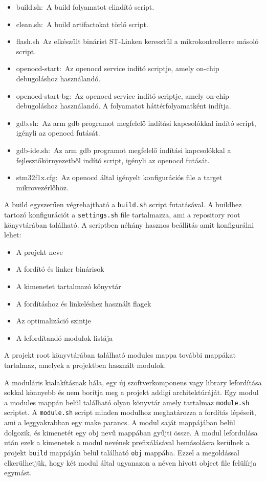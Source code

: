 \begin{itemize}
\item{build.sh:~A build folyamatot elindító script.}
\item{clean.sh:~A build artifactokat törlő script.}
\item{flash.sh~Az elkészült binárist ST-Linken keresztül a mikrokontrollerre
  másoló script.}
\item{openocd-start:~Az openocd service indító scriptje, amely on-chip
  debugoláshoz használandó.}
\item{openocd-start-bg:~Az openocd service indító scriptje, amely on-chip
  debugoláshoz használandó. A folyamatot háttérfolyamatként indítja.}
\item{gdb.sh:~Az arm gdb programot megfelelő indítási kapcsolókkal indító script,
  igényli az openocd futását.}
\item{gdb-ide.sh:~Az arm gdb programot megfelelő indítási kapcsolókkal a
  fejlesztőkörnyezetből indító script, igényli az openocd futását.}
\item{stm32f1x.cfg:~Az openocd által igényelt konfigurációs file a target
  mikrovezérlőhöz.}
\end{itemize}

A build egyszerűen végrehajtható a \verb|build.sh| script futatásával. A buildhez
tartozó konfigurációt a \verb|settings.sh| file tartalmazza, ami a repository
root könyvtárában található. A scriptben néhány hasznos beállítás amit
konfigurálni lehet:

\begin{itemize}
\item{A projekt neve}
\item{A fordító és linker binárisok}
\item{A kimenetet tartalmazó könyvtár}
\item{A fordításhoz és linkeléshez használt flagek}
\item{Az optimalizáció szintje}
\item{A lefordítandó modulok listája}
\end{itemize}

A projekt root könyvtárában található modules mappa további mappákat tartalmaz,
amelyek a projektben használt modulok.

A moduláris kialakításnak hála, egy új szoftverkomponens vagy library lefordítása
sokkal könnyebb és nem borítja meg a projekt addigi architektúráját. Egy modul a
modules mappán belül található olyan könyvtár amely tartalmaz \verb|module.sh|
scriptet.  A \verb|module.sh| script minden modulhoz meghatározza a fordítás
lépéseit, ami a leggyakrabban egy make parancs. A modul saját mappájában belül
dolgozik, és kimenetét egy obj nevű mappában gyűjti össze. A modul lefordulása
után ezek a kimenetek a modul nevének prefixálásával bemásolásra kerülnek a
projekt \verb|build| mappáján belül található \verb|obj| mappába. Ezzel a megoldással
elkerülhetjük, hogy két modul által ugyanazon a néven hívott object file
felülírja egymást.

